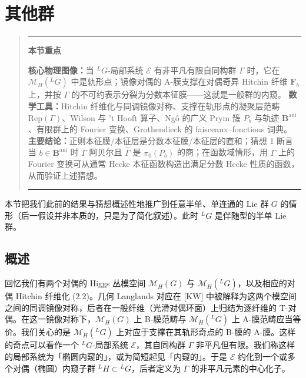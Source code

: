 \documentclass[11pt,a4paper]{article}
\newenvironment{keytakeaway}
  {\par\medskip\begin{quote}\small\noindent
   \rule{\linewidth}{0.6pt}\par\nopagebreak\smallskip\noindent
   \textbf{本节重点}\par\nobreak\smallskip\noindent\ignorespaces}
  {\par\smallskip\noindent\rule{\linewidth}{0.6pt}\end{quote}\medskip}
\begin{document}


\section{其他群}

\begin{keytakeaway}
\textbf{核心物理图像：}当 ${}^{L}G$-局部系统 $\mathcal{E}$ 有非平凡有限自同构群 $\Gamma$ 时，它在 $\mathcal{M}_H({}^{L}G)$ 中是轨形点；镜像对偶的 A-膜支撑在对偶奇异 Hitchin 纤维 $\boldsymbol{F}_b$ 上，并按 $\Gamma$ 的不可约表示分裂为分数本征膜——这就是一般群的内窥。
\textbf{数学工具：}Hitchin 纤维化与同调镜像对称、支撑在轨形点的凝聚层范畴 $\mathrm{Rep}(\Gamma)$、Wilson 与 't Hooft 算子、Ngô 的广义 Prym 簇 $P_b$ 与轨迹 $\boldsymbol{B}^{\mathrm{ani}}$、有限群上的 Fourier 变换、Grothendieck 的 faisceaux--fonctions 词典。
\textbf{主要结论：}正则本征膜/本征层是分数本征膜/本征层的直和；猜想 1 断言当 $b\in\boldsymbol{B}^{\mathrm{ani}}$ 时 $\Gamma$ 阿贝尔且 $\widehat{\Gamma}$ 是 $\pi_0(P_b)$ 的商；在函数域情形，用 $\Gamma$ 上的 Fourier 变换可从通常 Hecke 本征函数构造出满足分数 Hecke 性质的函数，从而验证上述猜想。
\end{keytakeaway}

本节把我们此前的结果与猜想概述性地推广到任意半单、单连通的 Lie 群 $G$ 的情形（后一假设并非本质的，只是为了简化叙述）。此时 ${}^{L}G$ 是伴随型的半单 Lie 群。

\subsection{概述}

回忆我们有两个对偶的 Higgs 丛模空间 $\mathcal{M}_H(G)$ 与 $\mathcal{M}_H({}^{L}G)$，以及相应的对偶 Hitchin 纤维化 (2.2)。几何 Langlands 对应在 [KW] 中被解释为这两个模空间之间的同调镜像对称，后者在一般纤维（光滑对偶环面）上归结为逐纤维的 T-对偶。在这一镜像对称下，$\mathcal{M}_H(G)$ 上 B-膜范畴与 $\mathcal{M}_H({}^{L}G)$ 上 A-膜范畴应当等价。我们关心的是 $\mathcal{M}_H({}^{L}G)$ 上对应于支撑在其轨形奇点的 B-膜的 A-膜。这样的奇点可以看作一个 ${}^{L}G$-局部系统 $\mathcal{E}$，其自同构群 $\Gamma$ 非平凡但有限。我们称这样的局部系统为「椭圆内窥的」，或为简短起见「内窥的」。于是 $\mathcal{E}$ 约化到一个或多个对偶（椭圆）内窥子群 ${}^{L}H\subset{}^{L}G$，后者定义为 $\Gamma$ 的非平凡元素的中心化子。
\end{document}
